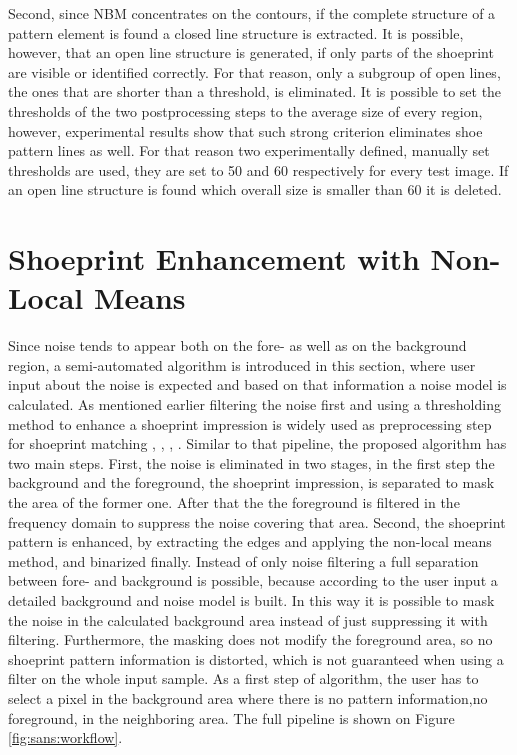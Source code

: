 \documentclass[draft,final]{vutinfth} %
\begin{document}
Second, since NBM concentrates on the contours, if the complete structure of a pattern element is found a closed line structure is extracted.
It is possible, however, that an open line structure is generated,  if only parts of the shoeprint are visible or identified correctly.
For that reason, only a subgroup of open lines, the ones that are shorter than a threshold, is eliminated.
It is possible to set the thresholds of the two postprocessing steps to the average size of every region, however, experimental results show that such strong criterion eliminates shoe pattern lines as well.
For that reason two experimentally defined, manually set thresholds are used, they are set to 50 and 60 respectively for every test image.
If an open line structure is found which overall size is smaller than 60 it is deleted.

\section{Shoeprint Enhancement with Non-Local Means}
\par
Since noise tends to appear both on the fore- as well as on the background region, a semi-automated algorithm is introduced in this section, where user input about the noise is expected and based on that information a noise model is calculated.
As mentioned earlier filtering the noise first and using a thresholding method to enhance a shoeprint impression is widely used as preprocessing step for shoeprint matching \cite{alizadeh2017automatic}, \cite{wang2014automatic}, \cite{li2014retrieval}, \cite{kong2014novel}.
Similar to that pipeline, the proposed algorithm has two main steps.
First, the noise is eliminated in two stages, in the first step the background and the foreground, the shoeprint impression, is separated to mask the area of the former one.
After that the the foreground is filtered in the frequency domain to suppress  the noise covering that area.
Second, the shoeprint pattern is enhanced, by extracting the edges and applying the non-local means method, and binarized finally.
Instead of only noise filtering a full separation between fore- and background is possible, because according to the user input a detailed background and noise model is built.
In this way it is possible to mask the noise in the calculated background area instead of just suppressing it with filtering.
Furthermore, the masking does not modify the foreground area, so no shoeprint pattern information is distorted, which is not guaranteed when using a filter on the whole input sample.
As a first step of algorithm, the user has to select a pixel in the background area where there is no pattern information,no foreground, in the neighboring area.
The full pipeline is shown on Figure \ref{fig:sans:workflow}.
\end{document}
